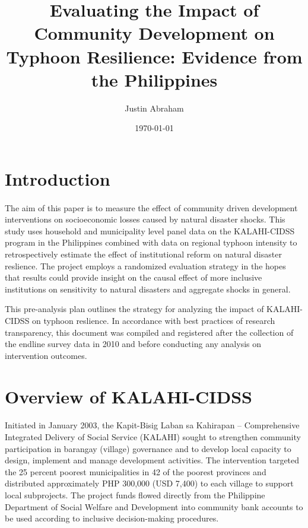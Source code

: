 \documentclass[12pt]{article}
\newcommand{\subtitle}[1]{%
  \posttitle{%
    \par\end{center}
    \begin{center}\Large#1\end{center}
    \vskip0.5em}%
}
\begin{document}
\title{Evaluating the Impact of Community Development on Typhoon Resilience: Evidence from the Philippines}
\subtitle{Pre-Analysis Plan}
\author{Justin Abraham}
\date{\today}
\maketitle


\section{Introduction}
	
	\paragraph{} The aim of this paper is to measure the effect of community driven development interventions on socioeconomic losses caused by natural disaster shocks. This study uses household and municipality level panel data on the KALAHI-CIDSS program in the Philippines combined with data on regional typhoon intensity to retrospectively estimate the effect of institutional reform on natural disaster reslience. The project employs a randomized evaluation strategy in the hopes that results could provide insight on the causal effect of more inclusive institutions on sensitivity to natural disasters and aggregate shocks in general.

	This pre-analysis plan outlines the strategy for analyzing the impact of KALAHI-CIDSS on typhoon reslience. In accordance with best practices of research transparency, this document was compiled and registered after the collection of the endline survey data in 2010 and before conducting any analysis on intervention outcomes.


\section{Overview of KALAHI-CIDSS}

	\paragraph{} Initiated in January 2003, the Kapit-Bisig Laban sa Kahirapan – Comprehensive Integrated Delivery of Social Service (KALAHI) sought to strengthen community participation in barangay (village) governance and to develop local capacity to design, implement and manage development activities. The intervention targeted the 25 percent poorest municipalities in 42 of the poorest provinces and distributed approximately PHP 300,000 (USD 7,400) to each village to support local subprojects. The project funds flowed directly from the Philippine Department of Social Welfare and Development into community bank accounts to be used according to inclusive decision-making procedures.
\end{document}
